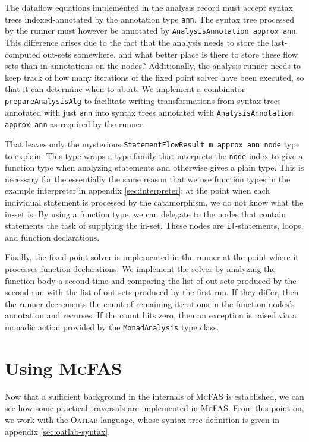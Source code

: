 \documentclass[letterpaper,11pt]{article}
\newcommand{\mcfas}{\textsc{McFAS}}
\newcommand{\oatlab}{\textsc{Oatlab}}
\newcommand{\code}{\texttt}
\begin{document}
The dataflow equations implemented in the analysis record must accept syntax
trees indexed-annotated by the annotation type \code{ann}. The syntax tree
processed by the runner must however be annotated by \code{AnalysisAnnotation
approx ann}. This difference arises due to the fact that the analysis needs to
store the last-computed out-sets somewhere, and what better place is there
to store these flow sets than in annotations on the nodes? Additionally, the
analysis runner needs to keep track of how many iterations of the fixed point
solver have been executed, so that it can determine when to abort. We implement
a combinator \code{prepareAnalysisAlg} to facilitate writing transformations
from syntax trees annotated with just \code{ann} into syntax trees annotated
with \code{AnalysisAnnotation approx ann} as required by the runner.

That leaves only the mysterious \code{StatementFlowResult m approx ann node}
type to explain. This type wraps a type family that interprets the \code{node}
index to give a function type when analyzing statements and otherwise gives a
plain type. This is necessary for the essentially the same reason that we use
function types in the example interpreter in appendix \ref{sec:interpreter}: at
the point when each individual statement is processed by the catamorphism, we
do not know what the in-set is. By using a function type, we can delegate to
the nodes that contain statements the task of supplying the in-set. These nodes
are \code{if}-statements, loops, and function declarations.

Finally, the fixed-point solver is implemented in the runner at the point where
it processes function declarations. We implement the solver by analyzing the
function body a second time and comparing the list of out-sets produced by the
second run with the list of out-sets produced by the first run. If they differ,
then the runner decrements the count of remaining iterations in the function
nodes's annotation and recurses. If the count hits zero, then an exception is
raised via a monadic action provided by the \code{MonadAnalysis} type class.

\section{Using \mcfas{}} \label{sec:using-mcfas}

Now that a sufficient background in the internals of \mcfas{} is established,
we can see how some practical traversals are implemented in \mcfas. From this
point on, we work with the \oatlab{} language, whose syntax tree definition is
given in appendix \ref{sec:oatlab-syntax}.
\end{document}
